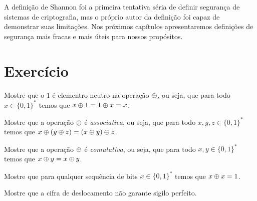 A definição de Shannon foi a primeira tentativa séria de definir segurança de sistemas de criptografia, mas o próprio autor da definição foi capaz de demonstrar suas limitações.
Nos próximos capítulos apresentaremos definições de segurança mais fracas e mais úteis para nossos propósitos.

\section{Exercício}
\label{sec:exercicio}

\begin{exercicio}
  Mostre que o $1$ é elementro neutro na operação $\oplus$, ou seja, que para todo $x \in \{0,1\}^*$ temos que $x \oplus 1 = 1 \oplus x = x$.
\end{exercicio}

\begin{exercicio}
  Mostre que a operação $\oplus$ é {\em associativa}, ou seja, que para todo $x,y,z \in \{0,1\}^*$ temos que $x \oplus (y \oplus z) = (x \oplus y) \oplus z$.
\end{exercicio}

\begin{exercicio}
  Mostre que a operação $\oplus$ é {\em comutativa}, ou seja, que para todo $x,y \in \{0,1\}^*$ temos que $x \oplus y = x \oplus y$.
\end{exercicio}

\begin{exercicio}
  Mostre que para qualquer sequência de bits $x \in \{0,1\}^*$ temos que $x \oplus x = 1$.
\end{exercicio}

\begin{exercicio}
  Mostre que a cifra de deslocamento não garante sigilo perfeito.
\end{exercicio}

